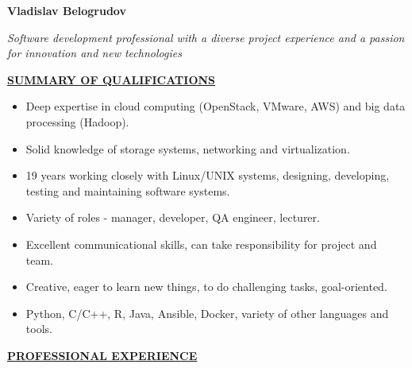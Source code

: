\documentclass[a4paper,12pt,]{article}
\begin{document}
  \parbox{\textwidth} {
    \parbox[b]{140mm}{
      { \bfseries \LARGE Vladislav Belogrudov}
      \vspace{5ex}

      \large \em
      Software development professional with a diverse project experience and a passion for innovation and new technologies
      \vspace{6ex}
    }
    \hfill
  }

  \uline{ \bfseries{SUMMARY OF QUALIFICATIONS} }
  
  \begin{itemize}
    \item Deep expertise in cloud computing (OpenStack, VMware, AWS) and big data processing (Hadoop).

    \item Solid knowledge of storage systems, networking and virtualization.

    \item 19 years working closely with Linux/UNIX systems,
      designing, developing, testing and maintaining software systems.
     
    \item Variety of roles - manager, developer, QA engineer, lecturer.

    \item Excellent communicational skills, can take responsibility for project and team.
      
    \item Creative, eager to learn new things, to do challenging tasks, goal-oriented.

    \item Python, C/C++, R, Java, Ansible, Docker, variety of other languages and tools.
  \end{itemize}
  
  \vspace{1ex}

  \uline{ \bfseries{PROFESSIONAL EXPERIENCE} }
\end{document}
